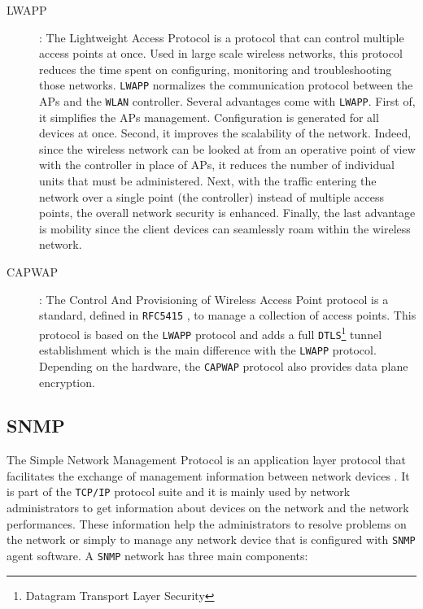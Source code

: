 \begin{description}
	\item [LWAPP]: The Lightweight Access Protocol is a protocol that can control multiple access points at once. Used in large scale wireless networks, this protocol reduces the time spent on configuring, monitoring and troubleshooting those networks. \texttt{LWAPP} normalizes the communication protocol between the APs and the \texttt{WLAN} controller. Several advantages come with \texttt{LWAPP}. First of, it simplifies the APs management. Configuration is generated for all devices at once. Second, it improves the scalability of the network. Indeed, since the wireless network can be looked at from an operative point of view with the controller in place of APs, it reduces the number of individual units that must be administered. Next, with the traffic entering the network over a single point (the controller) instead of multiple access points, the overall network security is enhanced. Finally, the last advantage is mobility since the client devices can seamlessly roam within the wireless network.


	\item [CAPWAP]: The Control And Provisioning of Wireless Access Point protocol is a standard, defined in \texttt{RFC5415} \cite{rfc5415}, to manage a collection of access points. This protocol is based on the \texttt{LWAPP} protocol and adds a full \texttt{DTLS}\footnote{Datagram Transport Layer Security} tunnel establishment which is the main difference with the \texttt{LWAPP} protocol. Depending on the hardware, the \texttt{CAPWAP} protocol also provides data plane encryption.
\end{description}

\subsection{SNMP}

The Simple Network Management Protocol is an application layer protocol that facilitates the exchange of management information between network devices \cite{snmp}. It is part of the \texttt{TCP/IP} protocol suite and it is mainly used by network administrators to get information about devices on the network and the network performances. These information help the administrators to resolve problems on the network or simply to manage any network device that is configured with \texttt{SNMP} agent software. A \texttt{SNMP} network has three main components:

